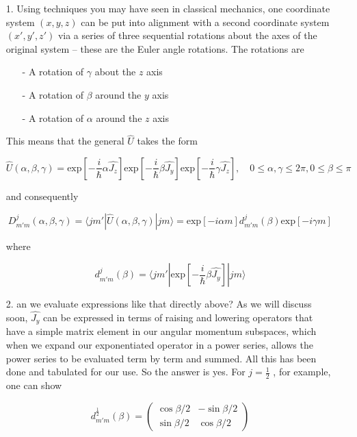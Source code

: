 \begin{itemize}
  \item[1.] Using techniques you may have seen in classical mechanics, one
    coordinate system $(x,y,z)$ can be put into alignment with a second
    coordinate system $(x',y',z')$ via a series of three sequential rotations
    about the axes of the original system -- these are the Euler angle
    rotations. The rotations are 

    \begin{itemize}
      \item[-] A rotation of $\gamma$ about the $z$ axis 
      \item[-] A rotation of $\beta$ around the $y$ axis
      \item[-] A rotation of $\alpha$ around the $z$ axis
    \end{itemize}

    This means that the general $\hat{U}$ takes the form 

    \[
    \hat{U}(\alpha, \beta, \gamma) = \text{exp} \left[ -\frac{i}{\hbar} \alpha
    \hat{J_z}\right] \text{exp}  \left[ -\frac{i}{\hbar}\beta \hat{J_y}\right]
    \text{exp} \left[ -\frac{i}{\hbar} \gamma \hat{J_z}\right], \quad 0 \leq
    \alpha, \gamma \leq 2\pi, 0 \leq \beta \leq \pi
    \] \vspace{3px}
    
    and consequently 

    \[
      D_{m'm}^j (\alpha, \beta, \gamma) = \langle jm' | \hat{U}(\alpha, \beta,
      \gamma) | jm \rangle = \text{exp}  [ -i\alpha m] d_{m'm}^j (\beta)
      \text{exp} [-i\gamma m]
    \] \vspace{3px}
    
    where 

    \[
      d_{m'm}^j(\beta) = \langle jm' | \text{exp} \left[ -\frac{i}{\hbar} \beta
      \hat{J_y} \right] | jm\rangle 
    \] \vspace{3px}
    
  \item[2.] an we evaluate expressions like that directly above? As we will
    discuss soon, $\hat{J_y}$ can be
expressed in terms of raising and lowering operators that have a simple matrix element in our
angular momentum subspaces, which when we expand our exponentiated operator in a power
series, allows the power series to be evaluated term by term and summed. All this has been
done and tabulated for our use. So the answer is yes. For $j = \frac{1}{2}$
, for example, one can show

\[
  d_{m'm}^\frac{1}{2} (\beta) = \begin{pmatrix}
    \cos \beta /2 & -\sin \beta /2 \\ \sin \beta/2 & \cos \beta /2 
  \end{pmatrix} 
\] \vspace{3px}

\end{itemize} 

